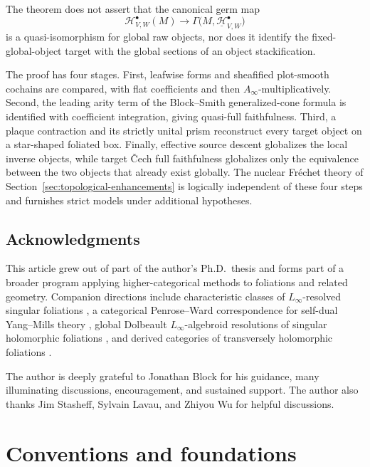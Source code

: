 \documentclass[12pt]{amsart}
\theoremstyle{definition}
\theoremstyle{remark}
\numberwithin{equation}{section}
\newcommand{\1}{{\mathbb{1}}}
\begin{document}
The theorem does not assert that the canonical germ map
\[
 \mathcal H^\bullet_{V,W}(M)
 \longrightarrow
 \Gamma\bigl(M,\underline{\mathcal H}^\bullet_{V,W}\bigr)
\]
is a quasi-isomorphism for global raw objects, nor does it identify the
fixed-global-object target with the global sections of an object
stackification.

The proof has four stages.  First, leafwise forms and sheafified
plot-smooth cochains are compared, with flat coefficients and then
$A_\infty$-multiplicatively.  Second, the leading arity term of the
Block--Smith generalized-cone formula is identified with coefficient
integration, giving quasi-full faithfulness.  Third, a plaque
contraction and its strictly unital prism reconstruct every target
object on a star-shaped foliated box.  Finally, effective source
descent globalizes the local inverse objects, while target \v{C}ech
full faithfulness globalizes only the equivalence between the two
objects that already exist globally.  The nuclear Fr\'echet theory of
Section~\ref{sec:topological-enhancements} is logically independent of
these four steps and furnishes strict models under additional
hypotheses.

\subsection*{Acknowledgments}

This article grew out of part of the author's Ph.D.\ thesis
\cite{ZengThesis} and forms part of a broader program applying
higher-categorical methods to foliations and related geometry.
Companion directions include characteristic classes of
$L_\infty$-resolved singular foliations
\cite{BlockZengSingularClassesPrep}, a categorical Penrose--Ward
correspondence for self-dual Yang--Mills theory
\cite{BlockZengPenroseWardPrep}, global Dolbeault
$L_\infty$-algebroid resolutions of singular holomorphic foliations
\cite{BlockWeiZengDolbeaultPrep}, and derived categories of
transversely holomorphic foliations
\cite{ZengTransverseHolomorphicPrep}.

The author is deeply grateful to Jonathan Block for his guidance,
many illuminating discussions, encouragement, and sustained support.
The author also thanks Jim Stasheff, Sylvain Lavau, and Zhiyou Wu for
helpful discussions.

\section{Conventions and foundations}
\end{document}
